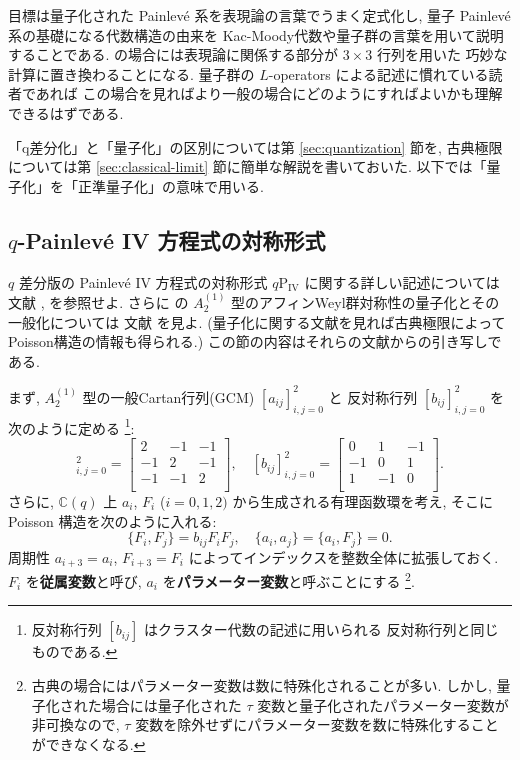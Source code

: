 \documentclass[12pt,twoside,dvipdfm]{msjproc}
\newcommand\C{{\mathbb C}} %
\theoremstyle{definition} %
\theoremstyle{definition} %
\theoremstyle{definition} %
\numberwithin{theorem}{section}
\numberwithin{equation}{section}
\numberwithin{figure}{section}
\numberwithin{table}{section}
\newcommand\secref[1]{第 \ref{#1} 節}
\newcommand\qP[1]{{\text{$q\mathrm{P}_{\text{#1}}$}}}
\begin{document}
目標は量子化された Painlev\'e 系を表現論の言葉でうまく定式化し, 
量子 Painlev\'e 系の基礎になる代数構造の由来を
Kac-Moody代数や量子群の言葉を用いて説明することである.
\qP{IV}の場合には表現論に関係する部分が $3\times 3$ 行列を用いた
巧妙な計算に置き換わることになる.
量子群の $L$-operators による記述に慣れている読者であれば
この場合を見ればより一般の場合にどのようにすればよいかも理解できるはずである.

「q差分化」と「量子化」の区別については\secref{sec:quantization}を, 
古典極限については\secref{sec:classical-limit}に簡単な解説を書いておいた.
以下では「量子化」を「正準量子化」の意味で用いる.



\subsection{$q$-Painlev\'e IV 方程式の対称形式 \qP{IV}}

$q$ 差分版の Painlev\'e IV 方程式の対称形式 $\qP{IV}$ に関する詳しい記述については
文献 \cite{KNY-qPIV}, \cite{Noumi-AWG} を参照せよ.
さらに \qP{IV} の $A^{(1)}_2$ 型のアフィンWeyl群対称性の量子化とその一般化については
文献  \cite{Hasegawa-QB} を見よ. 
(量子化に関する文献を見れば古典極限によってPoisson構造の情報も得られる.)
この節の内容はそれらの文献からの引き写しである. 

まず, $A^{(1)}_2$ 型の一般Cartan行列(GCM) $[a_{ij}]_{i,j=0}^2$ と
反対称行列 $[b_{ij}]_{i,j=0}^2$ を次のように定める%
\footnote{反対称行列 $[b_{ij}]$ はクラスター代数の記述に用いられる
反対称行列と同じものである.}:
\begin{equation*}
  [a_{ij}]_{i,j=0}^2 = 
  \begin{bmatrix}
     2 & -1 & -1 \\
   -1 &  2 & -1 \\
   -1 & -1 & 2 \\
  \end{bmatrix},
  \quad
  [b_{ij}]_{i,j=0}^2 =
  \begin{bmatrix}
      0 & 1 & -1 \\
    -1 & 0 & 1   \\
     1 & -1 & 0 \\
  \end{bmatrix}.
\end{equation*}
さらに, $\C(q)$ 上 $a_i$, $F_i$ ($i=0,1,2)$ から生成される有理函数環を考え, 
そこに Poisson 構造を次のように入れる:
\begin{equation*}
 \{F_i, F_j\} = b_{ij} F_i F_j, \quad \{a_i,a_j\}=\{a_i,F_j\}=0.
\end{equation*}
周期性 $a_{i+3}=a_i$, $F_{i+3}=F_i$ によってインデックスを整数全体に拡張しておく.
$F_i$ を{\bf 従属変数}と呼び, $a_i$ を{\bf パラメーター変数}と呼ぶことにする%
\footnote{古典の場合にはパラメーター変数は数に特殊化されることが多い.
しかし, 量子化された場合には量子化された $\tau$ 変数と量子化されたパラメーター変数が
非可換なので, $\tau$ 変数を除外せずにパラメーター変数を数に特殊化することができなくなる.}.
\end{document}
